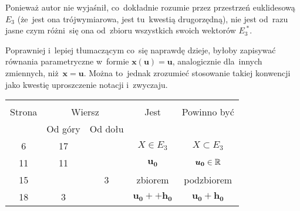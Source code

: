\documentclass[a4paper,11pt]{article}
\begin{document}




\start {} Ponieważ autor nie wyjaśnił, co~dokładnie rozumie przez
przestrzeń euklidesową $E_{ 3 }$ (że~jest ona trójwymiarowa, jest
tu~kwestią drugorzędną), nie jest od~razu jasne czym różni~się ona
od~zbioru wszystkich swoich wektorów $E_{ 3 }^{ \;* }$.

\vspace{\spaceFour}





\start {} Poprawniej i~lepiej tłumaczącym co~się naprawdę dzieje,
byłoby zapisywać równania parametryczne w~formie
$\boldsymbol{ x( u ) } = \boldsymbol{ u }$, analogicznie dla~innych
zmiennych, niż~$\boldsymbol{ x } = \boldsymbol{ u }$. Można to~jednak
zrozumieć stosowanie takiej konwencji jako kwestię uproszczenie notacji
i~zwyczaju.

\vspace{\spaceFour}







\begin{center}

  \begin{tabular}{|c|c|c|c|c|}
    \hline
    & \multicolumn{2}{c|}{} & & \\
    Strona & \multicolumn{2}{c|}{Wiersz} & Jest
                              & Powinno być \\ \cline{2-3}
    & Od góry & Od dołu & & \\
    \hline
    6   & 17 & & $X \in E_{ 3 }$ & $X \subset E_{ 3 }$ \\
    11  & 11 & & $\boldsymbol{u_{ 0 }}$ & $\boldsymbol{u_{ 0 }} \in \mathbb{R}$ \\
    15  & &  3 & zbiorem & podzbiorem \\
    18  &  3 & & $\boldsymbol{u_{ 0 }} + + \boldsymbol{h_{ 0 }}$
           & $\boldsymbol{u_{ 0 }} + \boldsymbol{h_{ 0 }}$ \\
    \hline
  \end{tabular}

\end{center}
\end{document}
